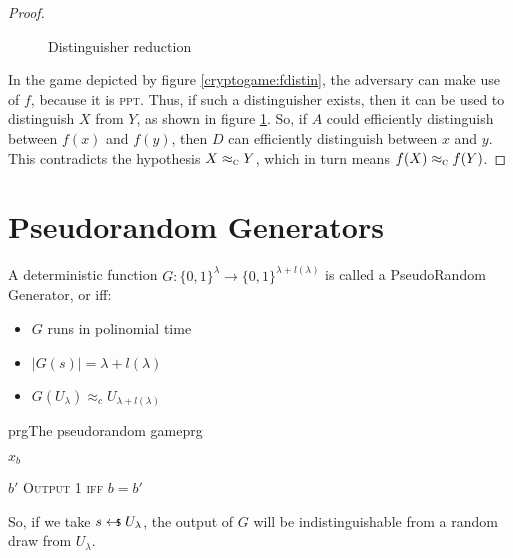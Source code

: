 \begin{proof}
\begin{figure}
        \caption{Distinguisher reduction}
        \label{fig:distredux}
    \end{figure}


    In the game depicted by figure \ref{cryptogame:fdistin}, the adversary can make use of $f$, because it is \textsc{ppt}. Thus, if such a distinguisher exists, then it can be used to distinguish $X$ from $Y$, as shown in figure \ref{fig:distredux}. So, if $A$ could efficiently distinguish between $f(x)$ and $f(y)$, then $D$ can efficiently distinguish between $x$ and $y$. This contradicts the hypothesis $X \approx_\textsc{c} Y$, which in turn means $f(X) \approx_\textsc{c} f(Y)$.

\end{proof}

\pagebreak

\section{Pseudorandom Generators}

A deterministic function $G:\{0,1\}^{\lambda} \to \{0,1\}^{\lambda + l(\lambda)} $ is called a PseudoRandom Generator, or \prg{} iff:
\begin{itemize}
    \item $G$ runs in polinomial time
    \item $|G(s)| = \lambda + l(\lambda)$ %
    \item $G(U_{\lambda}) \approx_{c} U_{\lambda + l(\lambda)}$
\end{itemize}

\begin{cryptogame}{prg}{The pseudorandom game}{prg}
    
    {$x_b$}
    {}

    \cseqdelay

    \send{}
    {$b'$}
    {\textsc{Output 1 iff} $b = b'$}
    
\end{cryptogame}

So, if we take $s \pickUAR U_{\lambda}$, the output of $G$ will be indistinguishable from a random draw from $U_{\lambda}$.

